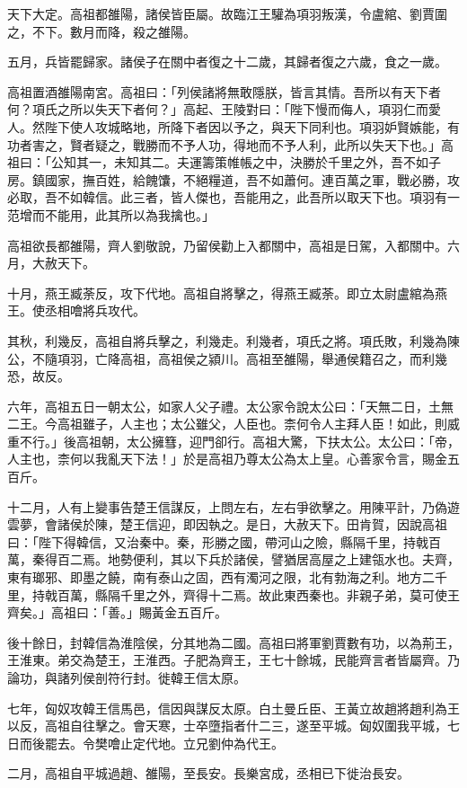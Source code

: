 \begin{pinyinscope}
天下大定。高祖都雒陽，諸侯皆臣屬。故臨江王驩為項羽叛漢，令盧綰、劉賈圍之，不下。數月而降，殺之雒陽。

五月，兵皆罷歸家。諸侯子在關中者復之十二歲，其歸者復之六歲，食之一歲。

高祖置酒雒陽南宮。高祖曰：「列侯諸將無敢隱朕，皆言其情。吾所以有天下者何？項氏之所以失天下者何？」高起、王陵對曰：「陛下慢而侮人，項羽仁而愛人。然陛下使人攻城略地，所降下者因以予之，與天下同利也。項羽妒賢嫉能，有功者害之，賢者疑之，戰勝而不予人功，得地而不予人利，此所以失天下也。」高祖曰：「公知其一，未知其二。夫運籌策帷帳之中，決勝於千里之外，吾不如子房。鎮國家，撫百姓，給餽馕，不絕糧道，吾不如蕭何。連百萬之軍，戰必勝，攻必取，吾不如韓信。此三者，皆人傑也，吾能用之，此吾所以取天下也。項羽有一范增而不能用，此其所以為我擒也。」

高祖欲長都雒陽，齊人劉敬說，乃留侯勸上入都關中，高祖是日駕，入都關中。六月，大赦天下。

十月，燕王臧荼反，攻下代地。高祖自將擊之，得燕王臧荼。即立太尉盧綰為燕王。使丞相噲將兵攻代。

其秋，利幾反，高祖自將兵擊之，利幾走。利幾者，項氏之將。項氏敗，利幾為陳公，不隨項羽，亡降高祖，高祖侯之潁川。高祖至雒陽，舉通侯籍召之，而利幾恐，故反。

六年，高祖五日一朝太公，如家人父子禮。太公家令說太公曰：「天無二日，土無二王。今高祖雖子，人主也；太公雖父，人臣也。柰何令人主拜人臣！如此，則威重不行。」後高祖朝，太公擁篲，迎門卻行。高祖大驚，下扶太公。太公曰：「帝，人主也，柰何以我亂天下法！」於是高祖乃尊太公為太上皇。心善家令言，賜金五百斤。

十二月，人有上變事告楚王信謀反，上問左右，左右爭欲擊之。用陳平計，乃偽遊雲夢，會諸侯於陳，楚王信迎，即因執之。是日，大赦天下。田肯賀，因說高祖曰：「陛下得韓信，又治秦中。秦，形勝之國，帶河山之險，縣隔千里，持戟百萬，秦得百二焉。地勢便利，其以下兵於諸侯，譬猶居高屋之上建瓴水也。夫齊，東有瑯邪、即墨之饒，南有泰山之固，西有濁河之限，北有勃海之利。地方二千里，持戟百萬，縣隔千里之外，齊得十二焉。故此東西秦也。非親子弟，莫可使王齊矣。」高祖曰：「善。」賜黃金五百斤。

後十餘日，封韓信為淮陰侯，分其地為二國。高祖曰將軍劉賈數有功，以為荊王，王淮東。弟交為楚王，王淮西。子肥為齊王，王七十餘城，民能齊言者皆屬齊。乃論功，與諸列侯剖符行封。徙韓王信太原。

七年，匈奴攻韓王信馬邑，信因與謀反太原。白土曼丘臣、王黃立故趙將趙利為王以反，高祖自往擊之。會天寒，士卒墮指者什二三，遂至平城。匈奴圍我平城，七日而後罷去。令樊噲止定代地。立兄劉仲為代王。

二月，高祖自平城過趙、雒陽，至長安。長樂宮成，丞相已下徙治長安。


\end{pinyinscope}

